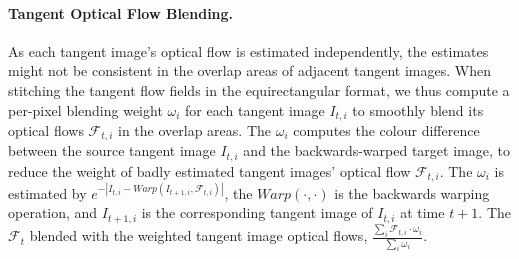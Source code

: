 \paragraph{Tangent Optical Flow Blending.}
%
As each tangent image's optical flow is estimated independently, the estimates might not be consistent in the overlap areas of adjacent tangent images.
%
%
%
%
When stitching the tangent flow fields in the equirectangular format, we thus compute a per-pixel blending weight $\omega_{i}$ for each tangent image $I_{t,i}$ to smoothly blend its optical flows $\mathcal{F}_{t,i}$ in the overlap areas.
The $\omega_{i}$ computes the colour difference between the source tangent image $I_{t,i}$ and the backwards-warped target image, to reduce the weight of badly estimated tangent images' optical flow $\mathcal{F}_{t,i}$.
%
The $\omega_i$ is estimated by 
$e^{-| I_{t,i} - Warp(I_{t+1,i}, \mathcal{F}_{t,i})|}$, the $Warp(\cdot , \cdot)$ is the backwards warping operation, and $I_{t+1,i}$ is the corresponding tangent image of $I_{t,i}$ at time ${t+1}$.
%
The $\mathcal{F}_t$ blended with the weighted tangent image optical flows,  $\frac{\sum_i{\mathcal{F}_{t,i} \cdot \omega_{i}}}{\sum_i{\omega_i}}$.

